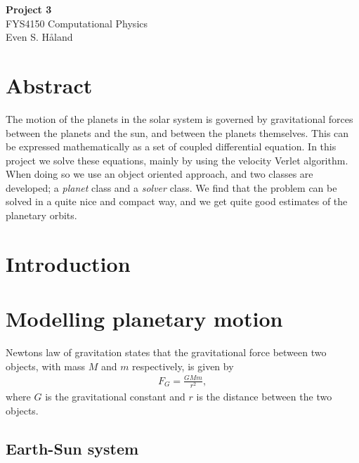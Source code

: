 \documentclass[12pt, a4paper]{article}
\begin{document}
\begin{titlepage}
\begin{center}
\vspace*{3cm}
\Huge
\textbf{Project 3} \\
\Large  
FYS4150 Computational Physics 
\vspace*{3cm} \\ 

Even S. Håland 
\vspace*{5cm} \\

\normalsize
\section*{Abstract}

The motion of the planets in the solar system is governed by gravitational forces between the planets 
and the sun, and between the planets themselves. This can be expressed mathematically as a set of coupled 
differential equation. In this project we solve these equations, mainly by using the velocity Verlet 
algorithm. When doing so we use an object oriented approach, and two classes are developed; a 
\textit{planet} class and a \textit{solver} class. We find that the problem can be solved in a quite nice 
and compact way, and we get quite good estimates of the planetary orbits.  

\end{center}
\end{titlepage}

\section{Introduction}

\section{Modelling planetary motion}

Newtons law of gravitation states that the gravitational force between two objects, with mass $M$ and $m$
respectively, is given by 
\begin{align}
F_G = \frac{GMm}{r^2}, 
\end{align}
where $G$ is the gravitational constant and $r$ is the distance between the two objects. 

\subsection*{Earth-Sun system}
\end{document}

